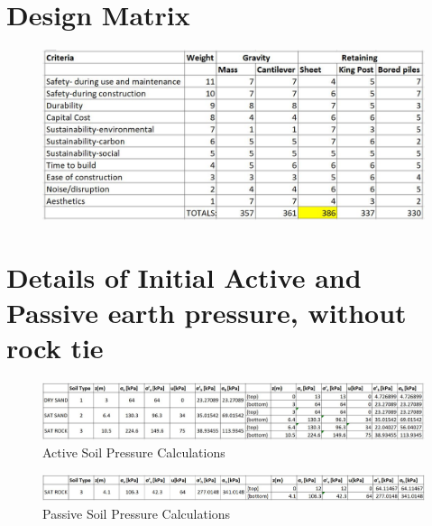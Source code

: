 \documentclass[12pt, a4paper]{article}
\begin{document}
\begin{appendices}
\section{Design Matrix}
\begin{figure}[H]
  \centering
  	\includegraphics[width=0.5\textheight]{designmatrix}
   	\caption{}
	\label{length}
\end{figure}
\section{Details of Initial Active and Passive earth pressure, without rock tie}

\begin{figure}[H]
\hspace*{-1cm}
  \centering
  	\includegraphics[width=0.75\textheight]{initialhorizstress}
   	\caption{Active Soil Pressure Calculations}
	\label{actinit}
\end{figure}

\begin{figure}[H]
\hspace*{-1cm}
  \centering
  	\includegraphics[width=0.75\textheight]{initialhorizstressPass}
   	\caption{Passive Soil Pressure Calculations}
	\label{passinit}
\end{figure}


\end{appendices}
\end{document}
